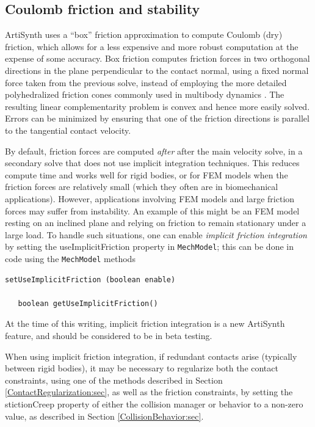 \subsection{Coulomb friction and stability}
\label{FrictionAndStability:sec}

ArtiSynth uses a ``box'' friction approximation
\cite{Lacoursiere07} to compute Coulomb (dry) friction,
which allows for a less expensive and more robust computation at the
expense of some accuracy. Box friction computes friction forces in two
orthogonal directions in the plane perpendicular to the contact
normal, using a fixed normal force taken from the previous solve,
instead of employing the more detailed polyhedralized friction cones
commonly used in multibody dynamics
\cite{AnitescuPotra2002,PotraEtAlTrapezoidal2006}. 
The resulting linear complementarity problem is convex and hence more
easily solved. Errors can be minimized by ensuring that one of the
friction directions is parallel to the tangential contact velocity.

By default, friction forces are computed {\it after} after the main
velocity solve, in a secondary solve that does not use implicit
integration techniques. This reduces compute time and works well for
rigid bodies, or for FEM models when the friction forces are
relatively small (which they often are in biomechanical applications).
However, applications involving FEM models and large friction forces
may suffer from instability. An example of this might be an FEM model
resting on an inclined plane and relying on friction to remain
stationary under a large load. To handle such situations, one can
enable {\it implicit friction integration} by setting the {\sf
useImplicitFriction} property in {\tt MechModel}; this can be done in
code using the {\tt MechModel} methods
%
\begin{lstlisting}[]
   setUseImplicitFriction (boolean enable)

   boolean getUseImplicitFriction()
\end{lstlisting}
%

\begin{sideblock}
At the time of this writing, implicit friction integration is a new
ArtiSynth feature, and should be considered to be in beta testing.

When using implicit friction integration, if redundant contacts arise
(typically between rigid bodies), it may be necessary to regularize
both the contact constraints, using one of the methods described in
Section \ref{ContactRegularization:sec}, as well as the friction
constraints, by setting the {\sf stictionCreep} property of either the
collision manager or behavior to a non-zero value, as described in
Section \ref{CollisionBehavior:sec}.
\end{sideblock}

\ifdefined\maindoc
\else

\fi
